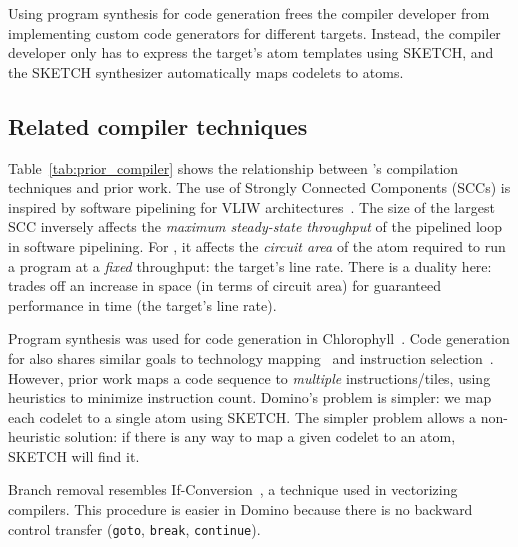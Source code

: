 Using program synthesis for code generation frees the compiler developer from
implementing custom code generators for different \absmachine targets.
Instead, the compiler developer only has to express the \absmachine target's
atom templates using SKETCH, and the SKETCH synthesizer automatically maps
codelets to atoms.


\subsection{Related compiler techniques}
\label{ss:related_compiler}
Table~\ref{tab:prior_compiler} shows the relationship between \pktlanguage's
compilation techniques and prior work. The use of Strongly Connected Components
(SCCs) is inspired by software pipelining for VLIW
architectures~\cite{software_pipelining}. The size of the largest SCC inversely
affects the {\em maximum steady-state throughput} of the pipelined loop in
software pipelining. For \pktlanguage, it affects the {\em circuit area} of the
atom required to run a program at a {\em fixed} throughput: the target's line
rate. There is a duality here: \pktlanguage trades off an increase in space (in
terms of circuit area) for guaranteed performance in time (the target's line
rate).

Program synthesis was used for code generation in
Chlorophyll~\cite{chlorophyll}.  Code generation for \pktlanguage also shares
similar goals to technology mapping~\cite{micheli} and instruction
selection~\cite{dragonbook}.  However, prior work maps a code sequence to
\textit{multiple} instructions/tiles, using heuristics to minimize instruction
count. Domino's problem is simpler: we map each codelet to a single atom using
SKETCH.  The simpler problem allows a non-heuristic solution: if there is any
way to map a given codelet to an atom, SKETCH will find it.

Branch removal resembles If-Conversion~\cite{if_conversion}, a technique used
in vectorizing compilers. This procedure is easier in Domino because there is
no backward control transfer ({\tt goto}, {\tt break}, {\tt continue}).

